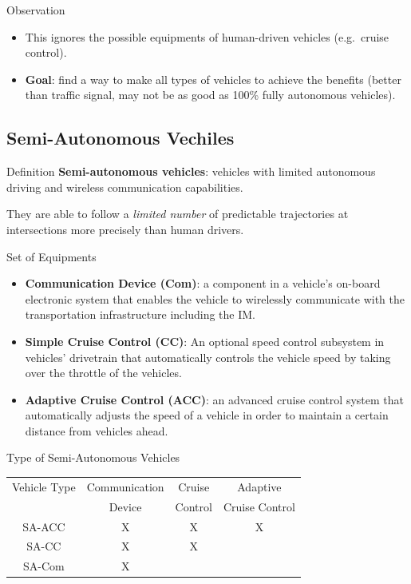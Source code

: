 \documentclass{beamer}
\newcommand{\goal}{find a way to make all types of vehicles to
achieve the benefits (better than traffic signal, may not be as good
as 100\% fully autonomous vehicles)}
\begin{document}
\begin{frame}{Observation}
\begin{itemize}
\item This ignores the possible equipments of human-driven vehicles
(e.g.\ cruise control).\pause
\item \textbf{Goal}: \goal.
\end{itemize}
\end{frame}

\subsection{Semi-Autonomous Vechiles}

\begin{frame}{Definition}
\textbf{Semi-autonomous vehicles}: vehicles with limited autonomous
driving and wireless communication capabilities.\pause

\hfill

They are able to follow a \textit{limited number} of predictable
trajectories at intersections more precisely than human drivers.
\end{frame}

\begin{frame}{Set of Equipments}
\begin{itemize}
\item \textbf{Communication Device (Com)}:
a component in a vehicle's on-board electronic system that enables the
vehicle to wirelessly communicate with the transportation
infrastructure including the IM.\pause
\item \textbf{Simple Cruise Control (CC)}:
An optional speed control subsystem in vehicles' drivetrain that
automatically controls the vehicle speed by taking over the throttle
of the vehicles.\pause
\item \textbf{Adaptive Cruise Control (ACC)}:
an advanced cruise control system that automatically adjusts the speed
of a vehicle in order to maintain a certain distance from vehicles
ahead.
\end{itemize}
\end{frame}

\begin{frame}{Type of Semi-Autonomous Vehicles}
\begin{tabular}{|c|c|c|c|}
  \hline
  Vehicle Type & Communication & Cruise & Adaptive \\
               & Device & Control & Cruise Control \\
  \hline
  SA-ACC & X & X & X  \\
  \hline
  SA-CC & X & X &  \\
  \hline
  SA-Com & X & &  \\
  \hline
\end{tabular}
\end{frame}
\end{document}

